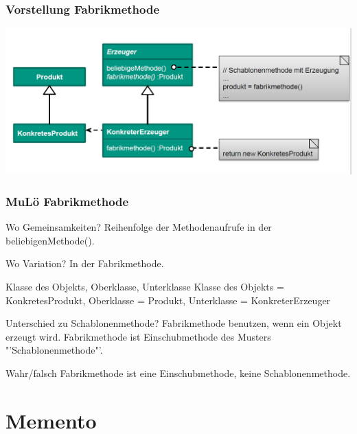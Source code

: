 \documentclass[18pt]{beamer}
\begin{document}
	\begin{frame}
		\frametitle{Vorstellung Fabrikmethode}
		\includegraphics[scale=0.4]{./pics/tut4/fab.png}
	\end{frame}

	\begin{frame}
		\frametitle{MuLö Fabrikmethode}
		\begin{block}{Wo Gemeinsamkeiten?}
			Reihenfolge der Methodenaufrufe in der beliebigenMethode().
		\end{block}
		\begin{block}{Wo Variation?}
			In der Fabrikmethode.
		\end{block}
		\begin{block}{Klasse des Objekts, Oberklasse, Unterklasse}
			Klasse des Objekts = KonkretesProdukt, Oberklasse = Produkt, Unterklasse = KonkreterErzeuger
		\end{block}
		\begin{block}{Unterschied zu Schablonenmethode?}
			Fabrikmethode benutzen, wenn ein Objekt erzeugt wird. Fabrikmethode ist Einschubmethode des Musters "'Schablonenmethode"'.
		\end{block}
		\begin{block}{Wahr/falsch}
			Fabrikmethode ist eine Einschubmethode, keine Schablonenmethode.
		\end{block}
	\end{frame}

\section{Memento}
\end{document}
